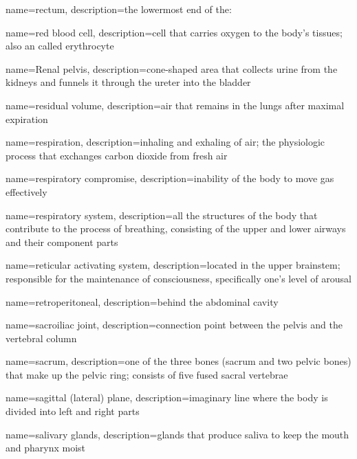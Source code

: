 \documentclass[../../EMT-169.tex]{subfiles}
\begin{document}
	{
		name=rectum,
		description={the lowermost end of the:}
	}
	
	{
		name=red blood cell,
		description={cell that carries oxygen to the body's tissues; also an called erythrocyte}
	}
	
	{
		name=Renal pelvis,
		description={cone-shaped area that collects urine from the kidneys and funnels it through the ureter into the bladder}
	}
	
	{
		name=residual volume,
		description={air that remains in the lungs after maximal expiration}
	}
	
	{
		name=respiration,
		description={inhaling and exhaling of air; the physiologic process that exchanges carbon dioxide from fresh air}
	}
	
	{
		name=respiratory compromise,
		description={inability of the body to move gas effectively}
	}
	
	{
		name=respiratory system,
		description={all the structures of the body that contribute to the process of breathing, consisting of the upper and lower airways and their component parts}
	}
	
	{
		name=reticular activating system,
		description={located in the upper brainstem; responsible for the maintenance of consciousness, specifically one's level of arousal}
	}
	
	{
		name=retroperitoneal,
		description={behind the abdominal cavity}
	}
	
	{
		name=sacroiliac joint,
		description={connection point between the pelvis and the vertebral column}
	}
	
	{
		name=sacrum,
		description={one of the three bones (sacrum and two pelvic bones) that make up the pelvic ring; consists of five fused sacral vertebrae}
	}
	
	{
		name=sagittal (lateral) plane,
		description={imaginary line where the body is divided into left and right parts}
	}
	
	{
		name=salivary glands,
		description={glands that produce saliva to keep the mouth and pharynx moist}
	}
	
\end{document}
